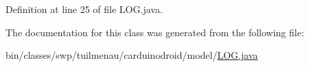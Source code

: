 Definition at line 25 of file L\+O\+G.\+java.



The documentation for this class was generated from the following file\+:\begin{DoxyCompactItemize}
\item 
bin/classes/swp/tuilmenau/carduinodroid/model/\hyperlink{bin_2classes_2swp_2tuilmenau_2carduinodroid_2model_2_l_o_g_8java}{L\+O\+G.\+java}\end{DoxyCompactItemize}
